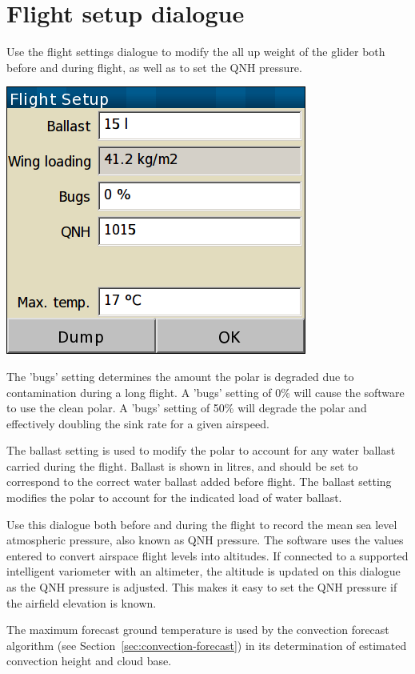 \section{Flight setup dialogue}\label{sec:flight-setup}
Use the flight settings dialogue to modify the all up weight of the glider both
before and during flight, as well as to set the QNH pressure.  

\begin{center}
\includegraphics[angle=0,width=0.45\linewidth,keepaspectratio='true']{figures/dialog-basicsettings.png}
\end{center}

The 'bugs' setting determines the amount the polar is degraded
due to contamination during a long flight.  A 'bugs' setting of 0\%
will cause the software to use the clean polar. A 'bugs' setting of
50\% will degrade the polar and effectively doubling the sink
rate for a given airspeed.

The ballast setting is used to modify the polar to account for any
water ballast carried during the flight. Ballast is shown in litres,
and should be set to correspond to the correct water ballast added
before flight.  The ballast setting modifies the polar to account for
the indicated load of water ballast.

Use this dialogue both before and during the flight to record the mean
sea level atmospheric pressure, also known as QNH pressure.  The
software uses the values entered to convert airspace flight levels
into altitudes.  If connected to a supported intelligent variometer
with an altimeter, the altitude is updated on this dialogue as the QNH
pressure is adjusted.  This makes it easy to set the QNH pressure if
the airfield elevation is known.

The maximum forecast ground temperature is used by the convection
forecast algorithm (see Section~\ref{sec:convection-forecast}) in its
determination of estimated convection height and cloud base.

